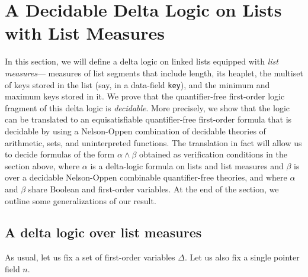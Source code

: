 \section{A Decidable Delta Logic on Lists with List Measures}

In this section, we will define a delta logic on linked lists equipped with \emph{list measures}--- measures of
list segments that include length, its heaplet, the multiset of keys stored in the list (say, in a data-field {\tt key}),
and the minimum and maximum keys stored in it. We prove that the quantifier-free first-order logic fragment of this delta logic 
is \emph{decidable}. More precisely, we show that the logic can be translated to an equisatisfiable quantifier-free first-order
formula that is decidable by using a Nelson-Oppen combination of decidable theories of arithmetic, sets, and uninterpreted functions.
The translation in fact will allow us to decide formulas of the form $\alpha \wedge \beta$ obtained as verification conditions
in the section above, where $\alpha$ is a delta-logic formula on lists and list measures and $\beta$ is over a decidable
Nelson-Oppen combinable quantifier-free theories, and where $\alpha$ and $\beta$ share Boolean and first-order variables.
At the end of the section, we outline some generalizations of our result.

\subsection*{A delta logic over list measures}
As usual, let us fix a set of first-order variables $\Delta$.
Let us also fix a single pointer field $n$.

